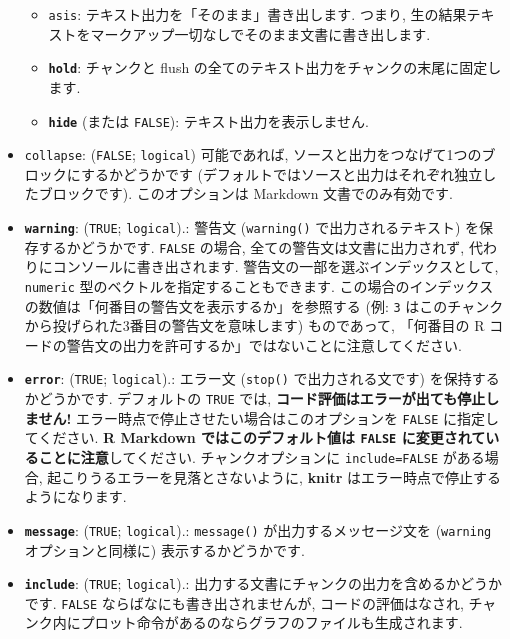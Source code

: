 \documentclass[
]{bxjsreport}
\providecommand{\tightlist}{%
  \setlength{\itemsep}{0pt}\setlength{\parskip}{0pt}}
\begin{document}
\begin{itemize}
  \begin{itemize}
  \tightlist
  \item
    \texttt{asis}: テキスト出力を「そのまま」書き出します. つまり,
    生の結果テキストをマークアップ一切なしでそのまま文書に書き出します.
  \item
    \textbf{\texttt{hold}}: チャンクと flush
    の全てのテキスト出力をチャンクの末尾に固定します.
  \item
    \textbf{\texttt{hide}} (または \texttt{FALSE}):
    テキスト出力を表示しません.
  \end{itemize}
\item
  \texttt{collapse}: (\texttt{FALSE}; \texttt{logical}) 可能であれば,
  ソースと出力をつなげて1つのブロックにするかどうかです
  (デフォルトではソースと出力はそれぞれ独立したブロックです).
  このオプションは Markdown 文書でのみ有効です.
\item
  \textbf{\texttt{warning}}: (\texttt{TRUE}; \texttt{logical}).: 警告文
  (\texttt{warning()} で出力されるテキスト) を保存するかどうかです.
  \texttt{FALSE} の場合, 全ての警告文は文書に出力されず,
  代わりにコンソールに書き出されます.
  警告文の一部を選ぶインデックスとして, \texttt{numeric}
  型のベクトルを指定することもできます.
  この場合のインデックスの数値は「何番目の警告文を表示するか」を参照する
  (例: \texttt{3} はこのチャンクから投げられた3番目の警告文を意味します)
  ものであって, 「何番目の R
  コードの警告文の出力を許可するか」ではないことに注意してください.
\item
  \textbf{\texttt{error}}: (\texttt{TRUE}; \texttt{logical}).: エラー文
  (\texttt{stop()} で出力される文です) を保持するかどうかです.
  デフォルトの \texttt{TRUE} では,
  \textbf{コード評価はエラーが出ても停止しません!}
  エラー時点で停止させたい場合はこのオプションを \texttt{FALSE}
  に指定してください. \textbf{R Markdown ではこのデフォルト値は
  \texttt{FALSE} に変更されていることに注意}してください.
  チャンクオプションに \texttt{include=FALSE} がある場合,
  起こりうるエラーを見落とさないように, \textbf{knitr}
  はエラー時点で停止するようになります.
\item
  \textbf{\texttt{message}}: (\texttt{TRUE}; \texttt{logical}).:
  \texttt{message()} が出力するメッセージ文を (\texttt{warning}
  オプションと同様に) 表示するかどうかです.
\item
  \textbf{\texttt{include}}: (\texttt{TRUE}; \texttt{logical}).:
  出力する文書にチャンクの出力を含めるかどうかです. \texttt{FALSE}
  ならばなにも書き出されませんが, コードの評価はなされ,
  チャンク内にプロット命令があるのならグラフのファイルも生成されます.

\end{itemize}
\end{document}

